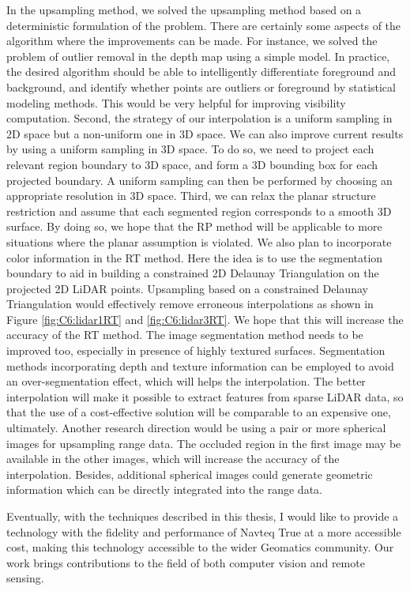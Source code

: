 In the upsampling method, we solved the upsampling method based on a deterministic formulation of the problem. There are certainly some aspects of the algorithm where the improvements can be made. For instance, we solved the problem of outlier removal in the depth map using a simple model. In practice, the desired algorithm should be able to intelligently differentiate foreground and background, and identify whether points are outliers or foreground by statistical modeling methods. This would be very helpful for improving visibility computation. Second, the strategy of our interpolation is a uniform sampling in 2D space but a non-uniform one in 3D space. We can also improve current results by using a uniform sampling in 3D space. To do so, we need to project each relevant region boundary to 3D space, and form a 3D bounding box for each projected boundary. A uniform sampling can then be performed by choosing an appropriate resolution in 3D space. Third, we can relax the planar structure restriction and assume that each segmented region corresponds to a smooth 3D surface. By doing so, we hope that the RP method will be applicable to more situations where the planar assumption is violated. We also plan to incorporate color information in the RT method. Here the idea is to use the segmentation boundary to aid in building a constrained 2D Delaunay Triangulation on the projected 2D LiDAR points. Upsampling based on a constrained Delaunay Triangulation would effectively remove erroneous interpolations as shown in Figure \ref{fig:C6:lidar1RT} and \ref{fig:C6:lidar3RT}. We hope that this will increase the accuracy of the RT method. The image segmentation method needs to be improved too, especially in presence of highly textured surfaces. Segmentation methods incorporating depth and texture information can be employed to avoid an over-segmentation effect, which will helps the interpolation. The better interpolation will make it
possible to extract features from sparse LiDAR data, so that
the use of a cost-effective solution will be comparable to an expensive one, ultimately. Another research direction would be using a pair or more spherical images for upsampling range data. The occluded region in the first image may be available in the other images, which will increase the accuracy of the interpolation. Besides, additional spherical images could generate geometric information which can be directly integrated into the range data. 

Eventually, with the techniques described in this thesis, I would like to provide a technology with the fidelity and performance of Navteq True at a more accessible cost, making this technology accessible to the wider Geomatics community.
Our work brings contributions to the field of both computer vision and remote sensing. 
